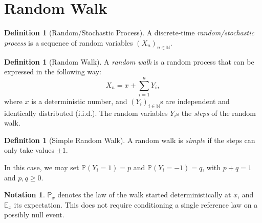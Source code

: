 \documentclass[11pt]{article}
\numberwithin{equation}{section}
\theoremstyle{definition}
\newtheorem{definition}[theorem]{Definition}
\newtheorem{notation}[theorem]{Notation}
\theoremstyle{remark}
\newcommand{\pqty}[1]{\left(#1\right)}
\newcommand{\NN}{\mathbb N}
\newcommand{\Prob}{\mathbb P}
\newcommand{\Expt}{\mathbb E}
\begin{document}
\section{Random Walk}\label{probability-section-08}

\begin{definition}[Random/Stochastic Process]\label{probability-definition-036}
    \label{probability-def:random-stochastic-process}%
    A discrete-time \emph{random/stochastic process} is a sequence of random variables \(\pqty{X_n}_{n \in \NN}\).
\end{definition}

\begin{definition}[Random Walk]\label{probability-definition-037}
    \label{probability-def:random-walk}%
    A \emph{random walk} is a random process that can be expressed in the following way:
    \[
        X_n = x + \sum_{i = 1}^{n} Y_i,
    \]
    where \(x\) is a deterministic number, and \(\pqty{Y_i}_{i \in \NN}\)s are independent and identically distributed (i.i.d.). The random variables \(Y_i\)s the \emph{steps} of the random walk.
\end{definition}

\begin{definition}[Simple Random Walk]\label{probability-definition-038}
    \label{probability-def:simple-random-walk}%
    A random walk is \emph{simple} if the steps can only take values \(\pm 1\).
\end{definition}

In this case, we may set \(\Prob\pqty{Y_i = 1} = p\) and \(\Prob\pqty{Y_i = -1} = q\), with \(p + q = 1\) and \(p, q \geq 0\).

\begin{notation}\label{probability-notation-002}
    \(\Prob_x\) denotes the law of the walk started deterministically at \(x\), and \(\Expt_x\) its expectation. This does not require conditioning a single reference law on a possibly null event.
\end{notation}
\end{document}
